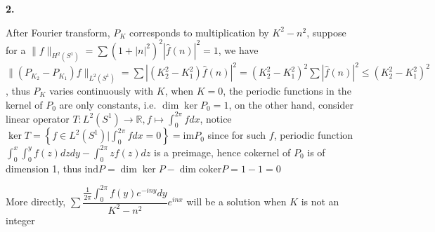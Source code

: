 \documentclass[10pt]{article}
\begin{document}
\textbf{2.} \par
After Fourier transform, $P_K$ corresponds to multiplication by $K^2-n^2$, suppose for a $\|f\|_{H^2(S^1)}=\sum (1+|n|^2)^2|\widehat{f}(n)|^2=1$, we have $\|(P_{K_2}-P_{K_1})f\|_{L^2(S^1)}=\sum |(K_2^2-K_1^2)\widehat{f}(n)|^2=(K_2^2-K_1^2)^2\sum |\widehat{f}(n)|^2\leq (K_2^2-K_1^2)^2$, thus $P_K$ varies continuously with $K$, when $K=0$, the periodic functions in the kernel of $P_0$ are only constants, i.e. $\dim \ker P_0=1$, on the other hand, consider linear operator $T:L^2(S^1)\rightarrow\mathbb R, f\mapsto \int_{0}^{2\pi}fdx$, notice $\ker T=\left\{f\in L^2(S^1)|\int_{0}^{2\pi}fdx=0\right\}=\mathrm{im} P_0$ since for such $f$, periodic function $\int_{0}^{x}\int_{0}^{y}f(z)dzdy-\int_0^{2\pi}zf(z)dz$ is a preimage, hence cokernel of $P_0$ is of dimension 1, thus $\mathrm{ind} P=\dim\ker P-\dim\mathrm{coker} P=1-1=0$ \par
More directly, $\displaystyle\sum \dfrac{\frac{1}{2\pi}\int_0^{2\pi}f(y)e^{-iny}dy}{K^2-n^2}e^{inx}$ will be a solution when $K$ is not an integer \par
\end{document}
